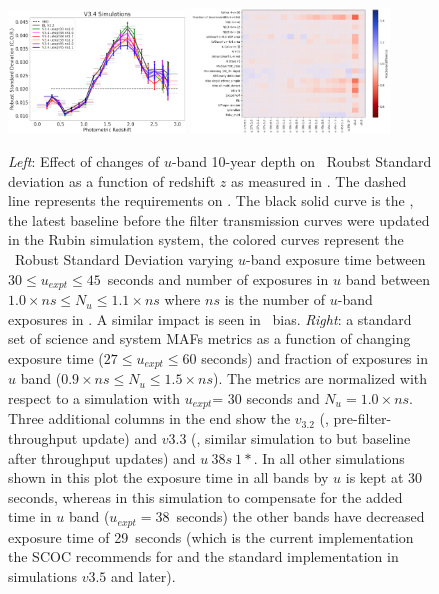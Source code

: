 \begin{figure}
\centering
\includegraphics[width=0.42\textwidth]{figures/photo-z.png}
\includegraphics[width=0.47\textwidth]{figures/u_band_scoc_heatmap.png}
\caption{\emph{Left}: Effect of changes of $u$-band 10-year depth on \pz\ Roubst Standard deviation as a function of redshift $z$ as measured in \cite{Graham_2017}. The dashed line represents the  requirements on \pz. The black solid curve is the , the latest baseline before the filter transmission curves were updated in the Rubin simulation system, the colored curves represent the \pz\ Robust Standard Deviation varying $u$-band exposure time between $30\leq u_{expt} \leq45$~seconds and number of exposures in $u$ band between $1.0\times ns \leq N_u \leq 1.1\times ns$ where $ns$ is the number of $u$-band exposures in . A similar impact is seen in \pz\ bias. \emph{Right}: a standard set of science and system MAFs metrics as a function of changing exposure time ($27\leq u_{expt}\leq 60$ seconds) and fraction of exposures in $u$ band ($0.9\times ns\leq N_u \leq1.5\times ns$). The metrics are normalized with respect to a simulation with $u_{expt}$= 30 seconds and $N_u = 1.0\times ns$. Three additional columns in the end show the $v_3.2$ (, pre-filter-throughput update) and $v3.3$ (, similar simulation to  but baseline after throughput updates) and $u~38s~1*$. In all other simulations shown in this plot the exposure time in all bands by $u$ is kept at 30 seconds, whereas in this simulation to compensate for the added time in $u$ band ($u_{expt}=38$~seconds) the other bands have decreased exposure time of 29~seconds (which is the current implementation the SCOC recommends for  and the standard implementation in simulations $v3.5$ and later).}

\end{figure}
\FloatBarrier

